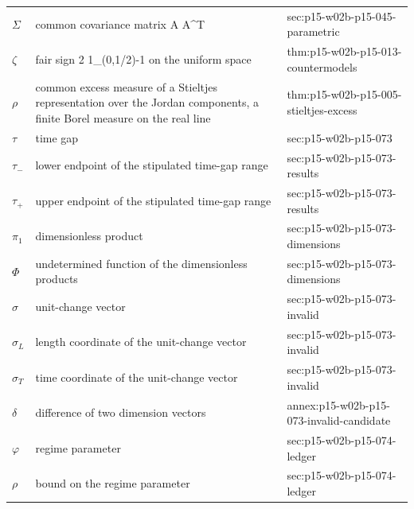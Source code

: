 \begin{longtable}{@{}p{}p{}p{}@{}}
\(\Sigma\) & common covariance matrix A A\^{}T & sec:\allowbreak{}p15-\allowbreak{}w02b-\allowbreak{}p15-\allowbreak{}045-\allowbreak{}parametric \\
\(\zeta\) & fair sign 2 1\_{(0,1/2)}-1 on the uniform space & thm:\allowbreak{}p15-\allowbreak{}w02b-\allowbreak{}p15-\allowbreak{}013-\allowbreak{}countermodels \\
\(\rho\) & common excess measure of a Stieltjes representation over the Jordan components, a finite Borel measure on the real line & thm:\allowbreak{}p15-\allowbreak{}w02b-\allowbreak{}p15-\allowbreak{}005-\allowbreak{}stieltjes-\allowbreak{}excess \\
\(\tau\) & time gap & sec:\allowbreak{}p15-\allowbreak{}w02b-\allowbreak{}p15-\allowbreak{}073 \\
\(\tau_-\) & lower endpoint of the stipulated time-gap range & sec:\allowbreak{}p15-\allowbreak{}w02b-\allowbreak{}p15-\allowbreak{}073-\allowbreak{}results \\
\(\tau_+\) & upper endpoint of the stipulated time-gap range & sec:\allowbreak{}p15-\allowbreak{}w02b-\allowbreak{}p15-\allowbreak{}073-\allowbreak{}results \\
\(\pi_1\) & dimensionless product & sec:\allowbreak{}p15-\allowbreak{}w02b-\allowbreak{}p15-\allowbreak{}073-\allowbreak{}dimensions \\
\(\Phi\) & undetermined function of the dimensionless products & sec:\allowbreak{}p15-\allowbreak{}w02b-\allowbreak{}p15-\allowbreak{}073-\allowbreak{}dimensions \\
\(\sigma\) & unit-change vector & sec:\allowbreak{}p15-\allowbreak{}w02b-\allowbreak{}p15-\allowbreak{}073-\allowbreak{}invalid \\
\(\sigma_L\) & length coordinate of the unit-change vector & sec:\allowbreak{}p15-\allowbreak{}w02b-\allowbreak{}p15-\allowbreak{}073-\allowbreak{}invalid \\
\(\sigma_T\) & time coordinate of the unit-change vector & sec:\allowbreak{}p15-\allowbreak{}w02b-\allowbreak{}p15-\allowbreak{}073-\allowbreak{}invalid \\
\(\delta\) & difference of two dimension vectors & annex:\allowbreak{}p15-\allowbreak{}w02b-\allowbreak{}p15-\allowbreak{}073-\allowbreak{}invalid-\allowbreak{}candidate \\
\(\varphi\) & regime parameter & sec:\allowbreak{}p15-\allowbreak{}w02b-\allowbreak{}p15-\allowbreak{}074-\allowbreak{}led{}ger \\
\(\rho\) & bound on the regime parameter & sec:\allowbreak{}p15-\allowbreak{}w02b-\allowbreak{}p15-\allowbreak{}074-\allowbreak{}led{}ger \\

\end{longtable}
